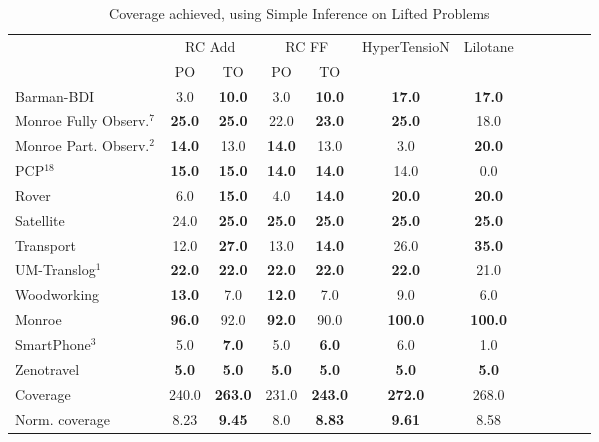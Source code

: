 \documentclass[letterpaper]{article} %
\begin{document}
\begin{table}
	\centering
	\caption{Coverage achieved, using Simple Inference on Lifted Problems}
	\label{table:LiftedSimpleCoverage}
	\scalebox{0.65} {
		\begin{tabular}{lccccccccccl} 
			\toprule 
			& \multicolumn{2}{c}{RC Add} & \multicolumn{2}{c}{RC FF} & HyperTensioN & Lilotane \\ 
			\cmidrule(lr){2-3} \cmidrule(lr){4-5}  
			&PO & TO & PO & TO  \\ 
\midrule 
Barman-BDI & 3.0 & \textbf{10.0} & 3.0 & \textbf{10.0} & \textbf{17.0} & \textbf{17.0}  \\ 
Monroe Fully Observ.$^{7}$ & \textbf{25.0} & \textbf{25.0} & 22.0 & \textbf{23.0} & \textbf{25.0} & 18.0  \\ 
Monroe Part. Observ.$^{2}$ & \textbf{14.0} & 13.0 & \textbf{14.0} & 13.0 & 3.0 & \textbf{20.0}  \\ 
PCP$^{18}$ & \textbf{15.0} & \textbf{15.0} & \textbf{14.0} & \textbf{14.0} & 14.0 & 0.0  \\ 
Rover & 6.0 & \textbf{15.0} & 4.0 & \textbf{14.0} & \textbf{20.0} & \textbf{20.0}  \\ 
Satellite & 24.0 & \textbf{25.0} & \textbf{25.0} & \textbf{25.0} & \textbf{25.0} & \textbf{25.0}  \\ 
Transport & 12.0 & \textbf{27.0} & 13.0 & \textbf{14.0} & 26.0 & \textbf{35.0}  \\ 
UM-Translog$^{1}$ & \textbf{22.0} & \textbf{22.0} & \textbf{22.0} & \textbf{22.0} & \textbf{22.0} & 21.0  \\ 
Woodworking & \textbf{13.0} & 7.0 & \textbf{12.0} & 7.0 & 9.0 & 6.0  \\ 
\midrule 
Monroe & \textbf{96.0} & 92.0 & \textbf{92.0} & 90.0 & \textbf{100.0} & \textbf{100.0}  \\ 
SmartPhone$^{3}$ & 5.0 & \textbf{7.0} & 5.0 & \textbf{6.0} & 6.0 & 1.0  \\ 
Zenotravel & \textbf{5.0} & \textbf{5.0} & \textbf{5.0} & \textbf{5.0} & \textbf{5.0} & \textbf{5.0}  \\ 
\midrule 
Coverage & 240.0 & \textbf{263.0} & 231.0 & \textbf{243.0} & \textbf{272.0} & 268.0  \\ 
Norm. coverage & 8.23 & \textbf{9.45} & 8.0 & \textbf{8.83} & \textbf{9.61} & 8.58  \\ 
\bottomrule 
		\end{tabular} 
		
	}
\end{table}
\end{document}
